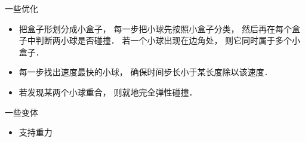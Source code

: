 
一些优化
\begin{itemize}
\item 把盒子形划分成小盒子， 每一步把小球先按照小盒子分类， 然后再在每个盒子中判断两小球是否碰撞． 若一个小球出现在边角处， 则它同时属于多个小盒子．
\item 每一步找出速度最快的小球， 确保时间步长小于某长度除以该速度．
\item 若发现某两个小球重合， 则就地完全弹性碰撞．
\end{itemize}

一些变体
\begin{itemize}
\item 支持重力
\end{itemize}
